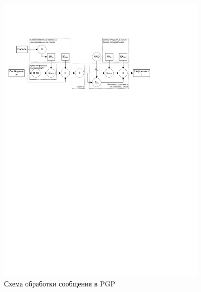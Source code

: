 \begin{figure}[h!]
	\centering
	\includegraphics[width=0.9\textwidth]{pic/pgp}
	\caption{Схема обработки сообщения в PGP\label{fig:pgp}}
\end{figure}

